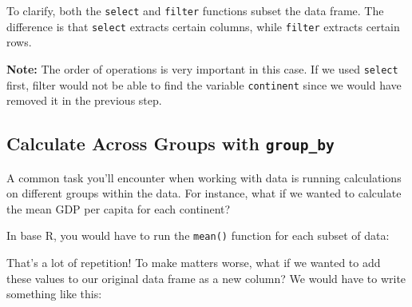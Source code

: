 \documentclass[]{book}
\newenvironment{Shaded}{\begin{snugshade}}{\end{snugshade}}
\newcommand{\CommentTok}[1]{\textcolor[rgb]{0.56,0.35,0.01}{\textit{#1}}}
\newcommand{\KeywordTok}[1]{\textcolor[rgb]{0.13,0.29,0.53}{\textbf{#1}}}
\newcommand{\NormalTok}[1]{#1}
\newcommand{\OperatorTok}[1]{\textcolor[rgb]{0.81,0.36,0.00}{\textbf{#1}}}
\newcommand{\StringTok}[1]{\textcolor[rgb]{0.31,0.60,0.02}{#1}}
\begin{document}
To clarify, both the \texttt{select} and \texttt{filter} functions subset the data frame. The difference is that \texttt{select} extracts certain columns, while \texttt{filter} extracts certain rows.

\textbf{Note:} The order of operations is very important in this case. If we used \texttt{select} first, filter would not be able to find the variable \texttt{continent} since we would have removed it in the previous step.

\hypertarget{calculate-across-groups-with-group_by}{%
\subsection{\texorpdfstring{Calculate Across Groups with \texttt{group\_by}}{Calculate Across Groups with group\_by}}\label{calculate-across-groups-with-group_by}}

A common task you'll encounter when working with data is running calculations on different groups within the data. For instance, what if we wanted to calculate the mean GDP per capita for each continent?

In base R, you would have to run the \texttt{mean()} function for each subset of data:

\begin{Shaded}
\end{Shaded}

That's a lot of repetition! To make matters worse, what if we wanted to add these values to our original data frame as a new column? We would have to write something like this:
\end{document}
